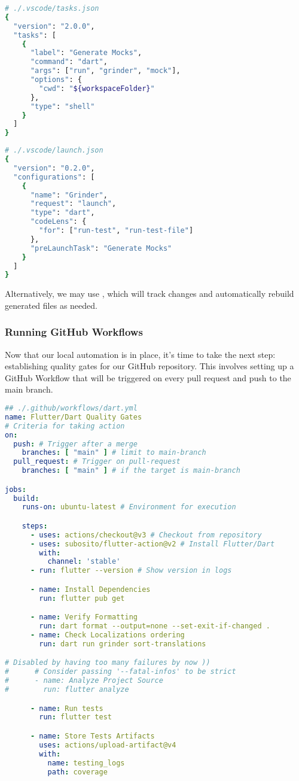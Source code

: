 \begin{lstlisting}[language=bash]
# ./.vscode/tasks.json
{
  "version": "2.0.0",
  "tasks": [
    {
      "label": "Generate Mocks",
      "command": "dart",
      "args": ["run", "grinder", "mock"],
      "options": {
        "cwd": "${workspaceFolder}"
      },
      "type": "shell"
    }
  ]
}
\end{lstlisting}
\newpage
\begin{lstlisting}[language=bash]
# ./.vscode/launch.json
{
  "version": "0.2.0",
  "configurations": [
    {
      "name": "Grinder",
      "request": "launch",
      "type": "dart",
      "codeLens": {
        "for": ["run-test", "run-test-file"]
      },
      "preLaunchTask": "Generate Mocks"
    }
  ]
}
\end{lstlisting}

\noindent Alternatively, we may use , which will track changes and automatically 
rebuild generated files as needed.


\subsubsection{Running GitHub Workflows}

Now that our local automation is in place, it's time to take the next step: establishing quality gates for our GitHub 
repository. This involves setting up a GitHub Workflow that will be triggered on every pull request and push to the main 
branch.

\begin{lstlisting}[language=yaml]
## ./.github/workflows/dart.yml
name: Flutter/Dart Quality Gates
# Criteria for taking action
on:
  push: # Trigger after a merge
    branches: [ "main" ] # limit to main-branch
  pull_request: # Trigger on pull-request
    branches: [ "main" ] # if the target is main-branch

jobs:
  build:
    runs-on: ubuntu-latest # Environment for execution

    steps:
      - uses: actions/checkout@v3 # Checkout from repository
      - uses: subosito/flutter-action@v2 # Install Flutter/Dart
        with:
          channel: 'stable'
      - run: flutter --version # Show version in logs

      - name: Install Dependencies
        run: flutter pub get

      - name: Verify Formatting
        run: dart format --output=none --set-exit-if-changed .
      - name: Check Localizations ordering
        run: dart run grinder sort-translations

# Disabled by having too many failures by now ))
#      # Consider passing '--fatal-infos' to be strict
#      - name: Analyze Project Source
#        run: flutter analyze

      - name: Run tests
        run: flutter test

      - name: Store Tests Artifacts
        uses: actions/upload-artifact@v4
        with:
          name: testing_logs
          path: coverage
\end{lstlisting}

